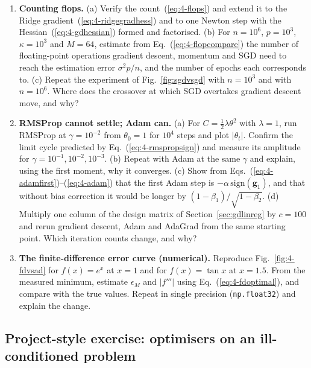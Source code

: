\begin{enumerate}
\item \textbf{Counting flops.}
  (a) Verify the count~(\ref{eq:4-flops}) and extend it to the Ridge
      gradient~(\ref{eq:4-ridgegradhess}) and to one Newton step with the
      Hessian~(\ref{eq:4-gdhessian}) formed and factorised.
  (b) For $n=10^{6}$, $p=10^{3}$, $\kappa=10^{3}$ and $M=64$, estimate from
      Eq.~(\ref{eq:4-flopcompare}) the number of floating-point operations
      gradient descent, momentum and SGD need to reach the estimation error
      $\sigma^{2}p/n$, and the number of epochs each corresponds to.
  (c) Repeat the experiment of Fig.~\ref{fig:sgdvsgd} with $n=10^{3}$ and
      with $n=10^{6}$.  Where does the crossover at which SGD overtakes
      gradient descent move, and why?

\item \textbf{RMSProp cannot settle; Adam can.}
  (a) For $C=\frac12\lambda\theta^{2}$ with $\lambda=1$, run RMSProp at
      $\gamma=10^{-2}$ from $\theta_0=1$ for $10^{4}$ steps and plot
      $|\theta_t|$.  Confirm the limit cycle predicted by
      Eq.~(\ref{eq:4-rmspropsign}) and measure its amplitude for
      $\gamma=10^{-1},10^{-2},10^{-3}$.
  (b) Repeat with Adam at the same $\gamma$ and explain, using the first
      moment, why it converges.
  (c) Show from Eqs.~(\ref{eq:4-adamfirst})--(\ref{eq:4-adam}) that the
      first Adam step is $-\alpha\,\mathrm{sign}(\bm{g}_1)$, and that without
      bias correction it would be longer by $(1-\beta_1)/\sqrt{1-\beta_2}$.
  (d) Multiply one column of the design matrix of
      Section~\ref{sec:gdlinreg} by $c=100$ and rerun gradient descent, Adam
      and AdaGrad from the same starting point.  Which iteration counts
      change, and why?

\item \textbf{The finite-difference error curve (numerical).}
  Reproduce Fig.~\ref{fig:4-fdvsad} for $f(x)=e^{x}$ at $x=1$ and for
  $f(x)=\tan x$ at $x=1.5$.  From the measured minimum, estimate $\epsilon_M$
  and $|f'''|$ using Eq.~(\ref{eq:4-fdoptimal}), and compare with the true
  values.  Repeat in single precision (\texttt{np.float32}) and explain the
  change.

\end{enumerate}

\subsection*{Project-style exercise: optimisers on an ill-conditioned problem}

